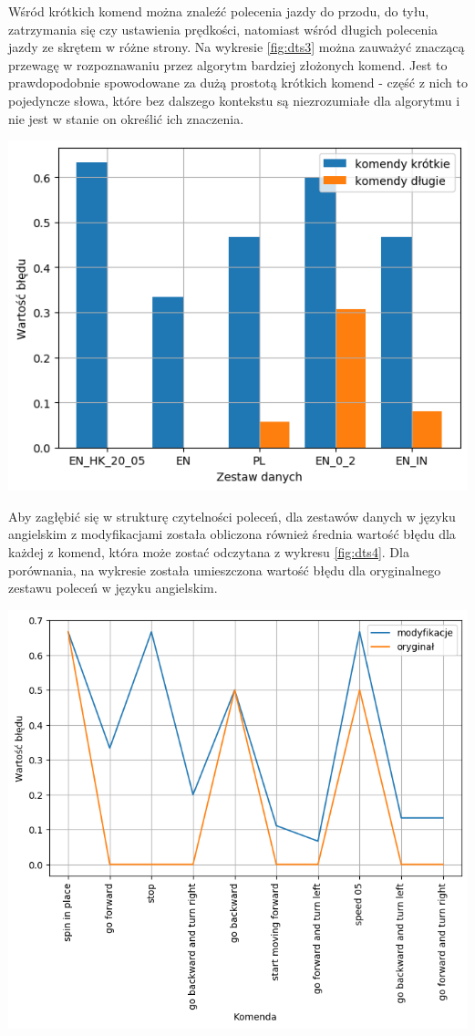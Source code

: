 Wśród krótkich komend można znaleźć polecenia jazdy do przodu, do tyłu, zatrzymania się czy ustawienia prędkości, natomiast wśród długich polecenia jazdy ze skrętem w różne strony. Na wykresie \ref{fig:dts3} można zauważyć znaczącą przewagę w rozpoznawaniu przez algorytm bardziej złożonych komend. Jest to prawdopodobnie spowodowane za dużą prostotą krótkich komend - część z nich to pojedyncze słowa, które bez dalszego kontekstu są niezrozumiałe dla algorytmu i nie jest w stanie on określić ich znaczenia. 

\begin{center}
    \includegraphics[width=0.7\linewidth]{files/output3.png}
    \label{fig:dts3}
\end{center}

Aby zagłębić się w strukturę czytelności poleceń, dla zestawów danych w języku angielskim z modyfikacjami została obliczona również średnia wartość błędu dla każdej z komend, która może zostać odczytana z wykresu \ref{fig:dts4}. Dla porównania, na wykresie została umieszczona wartość błędu dla oryginalnego zestawu poleceń w języku angielskim.

\begin{center}
    \includegraphics[width=0.7\linewidth]{files/output5.png}
    \label{fig:dts4}
\end{center}

